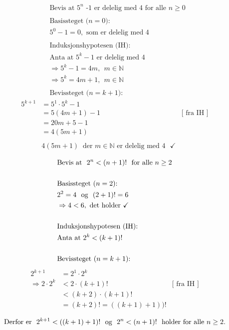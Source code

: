 \documentclass[norsk,8pt,a4paper]{report}
\newcommand{\oppgaveDel}[1]{\item[#1)]}
\begin{document}
\oppgaveDel{a}
\begin{align*}
&\text{Bevis at $5^n$ -1 er delelig med $4$ for alle $n \ge0$}\\\\
&\text{Basissteget ($n=0$):}\\
&5^0-1 = 0, \text{ som er delelig med $4$}\\\\
&\text{Induksjonshypotesen (IH):}\\
&\text{Anta at $5^k-1$ er delelig med 4}\\
&\Rightarrow5^k-1 = 4m, \ \ m \in \mathbb{N}\\
&\Rightarrow 5^k = 4m + 1, \ \ m \in \mathbb{N}\\\\
&\text{Bevissteget ($n = k+1$):}
\end{align*}
\begin{align*}
5^{k+1} &= 5^1 \cdot 5^k - 1\\
&= 5(4m + 1) - 1&\text{[ fra IH ]}\\
&= 20m + 5 - 1\\
&= 4(5m+1)\\\\
&4(5m+1) \ \text{ der $m \in \mathbb{N}$ er delelig med $4$ } \checkmark
\end{align*}

\oppgaveDel{b}
\begin{align*}
&\text{Bevis at $ \ 2^n < (n+1)! \ $ for alle $n \ge 2$}\\\\
&\text{Basissteget ($n=2$):}\\
&2^2 = 4 \ \text{ og } \ (2+1)! = 6\\
&\Rightarrow 4 < 6, \text{ det holder} \ \checkmark\\\\
&\text{Induksjonshypotesen (IH):}\\
&\text{Anta at $2^k < (k+1)!$}\\\\
&\text{Bevissteget ($n = k+1$):}
\end{align*}
\begin{align*}
2^{k+1} &= 2^1 \cdot 2^k\\
\Rightarrow 2 \cdot 2^k &< 2 \cdot (k+1)!&\text{[ fra IH ]}\\
&<(k+2) \cdot (k+1)!\\
&= (k+2)! = ((k+1)+1))!\\
\end{align*}
\begin{align*}
&\text{Derfor er } \ 2^{k+1} < ((k+1)+1)! \ \text{ og $ \ 2^n < (n+1)! \ $ holder for alle $n \ge 2$.}\\
\end{align*}
\end{document}
